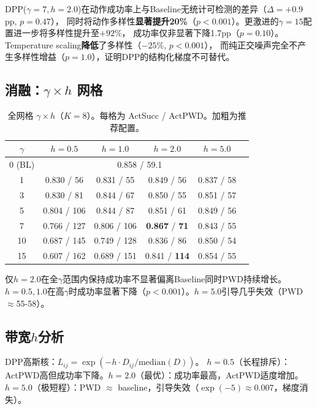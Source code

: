\documentclass[11pt]{article}
\begin{document}
DPP($\gamma{=}7, h{=}2.0$)在动作成功率上与Baseline无统计可检测的差异（$\Delta{=}{+}0.9$pp, $p{=}0.47$），
同时将动作多样性\textbf{显著提升20\%}（$p{<}0.001$）。更激进的$\gamma{=}15$配置进一步将多样性提升至$+92\%$，
成功率仅非显著下降1.7pp（$p{=}0.10$）。Temperature scaling\textbf{降低}了多样性（$-25\%$, $p{<}0.001$），
而纯正交噪声完全不产生多样性增益（$p{=}1.0$），证明DPP的结构化梯度不可替代。

\subsection{消融：$\gamma \times h$ 网格}

\begin{table}[t]
\centering
\caption{全网格 $\gamma \times h$（$K{=}8$）。每格为 ActSucc / ActPWD。加粗为推荐配置。}
\label{tab:grid}
\begin{tabular}{cccccc}
\toprule
$\gamma$ & $h{=}0.5$ & $h{=}1.0$ & $h{=}2.0$ & $h{=}5.0$ \\
\midrule
0 (BL) & \multicolumn{4}{c}{0.858 / 59.1} \\
1 & 0.830 / 56 & 0.831 / 55 & 0.849 / 56 & 0.837 / 58 \\
3 & 0.830 / 81 & 0.844 / 67 & 0.850 / 55 & 0.851 / 57 \\
5 & 0.804 / 106 & 0.844 / 87 & 0.851 / 61 & 0.849 / 56 \\
7 & 0.766 / 127 & 0.806 / 106 & \textbf{0.867} / \textbf{71} & 0.843 / 55 \\
10 & 0.687 / 145 & 0.749 / 128 & 0.836 / 86 & 0.850 / 54 \\
15 & 0.607 / 162 & 0.689 / 151 & 0.841 / \textbf{114} & 0.854 / 55 \\
\bottomrule
\end{tabular}
\end{table}

仅$h{=}2.0$在全$\gamma$范围内保持成功率不显著偏离Baseline同时PWD持续增长。
$h{=}0.5,1.0$在高$\gamma$时成功率显著下降（$p{<}0.001$）。$h{=}5.0$引导几乎失效（PWD$\approx$55-58）。

\subsection{带宽$h$分析}

DPP高斯核：$L_{ij} = \exp(-h \cdot D_{ij}/\text{median}(D))$。
$h=0.5$（长程排斥）：ActPWD高但成功率下降。$h=2.0$（最优）：成功率最高，ActPWD适度增加。$h=5.0$（极短程）：PWD $\approx$ baseline，引导失效（$\exp(-5) \approx 0.007$，梯度消失）。
\end{document}
